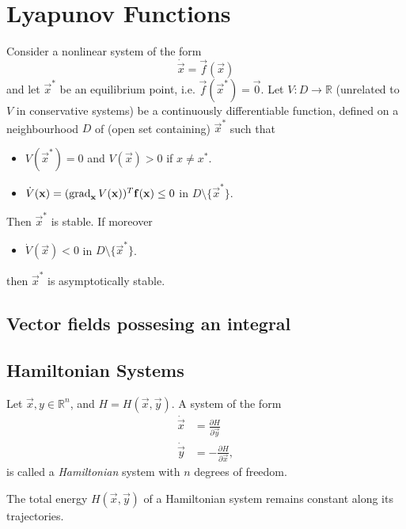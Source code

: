 \section{Lyapunov Functions}
\begin{theorem}
	Consider a nonlinear system of the form
	\begin{equation*}
		\dot{\vec x} = \vec f(\vec x)
	\end{equation*}
	and let $\vec x^\ast$ be an equilibrium point, i.e. $\vec f(\vec x^\ast) = \vec 0$.
	Let $V: D \to \mathbb R$ (unrelated to $V$ in conservative systems) be a continuously differentiable function, defined on a neighbourhood $D$ of (open set containing) $\vec x^\ast$ such that
	\begin{itemize}
		\item $V(\vec x^\ast) = 0$ and $V(\vec x) > 0$ if $x \neq x^\ast$.
		\item $\dot V(\boldsymbol{\mathbf{x}}) = (\operatorname{grad}_{\boldsymbol{\mathbf{x}}} V(\boldsymbol{\mathbf{x}}))^T \boldsymbol{\mathbf{f}}(\boldsymbol{\mathbf{x}}) \leq 0$ in $D \setminus \{\vec x^\ast\}$.
	\end{itemize}
	Then $\vec x^\ast$ is stable. If moreover
	\begin{itemize}
		\item $\dot V(\vec x) < 0$ in $D \setminus \{\vec x^\ast\}$.
	\end{itemize}
	then $\vec x^\ast$ is asymptotically stable.
\end{theorem}

\subsection{Vector fields possesing an integral}
\subsection{Hamiltonian Systems}
Let $\vec x, y \in \mathbb R^n$, and $H = H(\vec x, \vec y)$. A system of the form
\begin{align*}
	\dot{\vec x} &= \frac{\partial H}{\partial \vec y} \\
	\dot{\vec y} &= -\frac{\partial H}{\partial \vec x},
\end{align*}
is called a \emph{Hamiltonian} system with $n$ degrees of freedom.

\begin{theorem}
	The total energy $H(\vec x, \vec y)$ of a Hamiltonian system remains constant along its trajectories.
\end{theorem}

